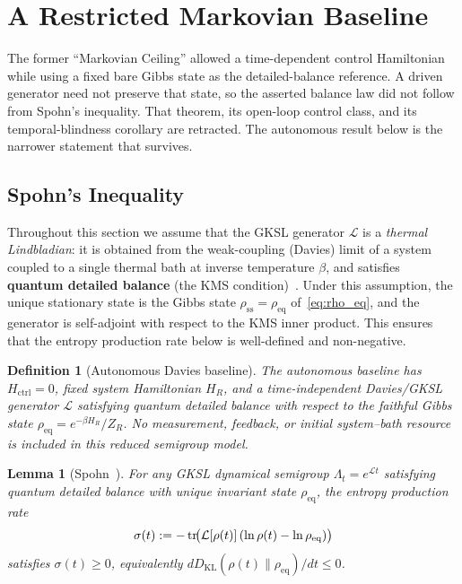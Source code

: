 \documentclass[12pt]{article}
\newtheorem{lemma}[theorem]{Lemma}
\newtheorem{definition}[theorem]{Definition}
\begin{document}
\section{A Restricted Markovian Baseline}
\label{sec:ceiling}

The former ``Markovian Ceiling'' allowed a time-dependent control
Hamiltonian while using a fixed bare Gibbs state as the
detailed-balance reference.  A driven generator need not preserve that
state, so the asserted balance law did not follow from Spohn's
inequality.  That theorem, its open-loop control class, and its
temporal-blindness corollary are retracted.  The autonomous result below
is the narrower statement that survives.

\subsection{Spohn's Inequality}

Throughout this section we assume that the GKSL generator
$\mathcal{L}$ is a \emph{thermal Lindbladian}: it is obtained
from the weak-coupling (Davies) limit of a system coupled to a
single thermal bath at inverse temperature $\beta$, and satisfies
\textbf{quantum detailed balance} (the KMS
condition)~\cite{Spohn1978,BreuerPetruccione2002}.
Under this assumption, the unique stationary state is the Gibbs
state $\rho_{\mathrm{ss}} = \rho_{\mathrm{eq}}$
of~\eqref{eq:rho_eq}, and the generator is self-adjoint with
respect to the KMS inner product.
This ensures that the entropy production rate below is
well-defined and non-negative.

\begin{definition}[Autonomous Davies baseline]
\label{def:autonomous_davies}
The autonomous baseline has $H_{\mathrm{ctrl}}=0$, fixed system
Hamiltonian $H_R$, and a time-independent Davies/GKSL generator
$\mathcal L$ satisfying quantum detailed balance with respect to the
faithful Gibbs state $\rho_{\mathrm{eq}}=e^{-\beta H_R}/Z_R$.
No measurement, feedback, or initial system--bath resource is included
in this reduced semigroup model.
\end{definition}

\begin{lemma}[Spohn~\cite{Spohn1978}]
\label{lem:spohn}
For any GKSL dynamical semigroup $\Lambda_t = e^{\mathcal{L}t}$
satisfying quantum detailed balance with unique invariant state
$\rho_{\mathrm{eq}}$, the entropy production
rate
\begin{equation}
\label{eq:spohn_sigma}
\sigma(t) := -\tr\!\bigl(\mathcal{L}[\rho(t)]\,
(\ln\rho(t) - \ln\rho_{\mathrm{eq}})\bigr)
\end{equation}
satisfies $\sigma(t) \geq 0$, equivalently
$dD_{\mathrm{KL}}(\rho(t)\|\rho_{\mathrm{eq}})/dt\leq0$.
\end{lemma}
\end{document}
